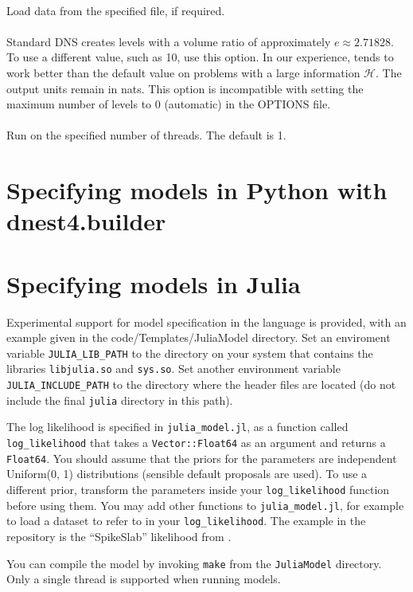 \documentclass[article]{jss}
\begin{document}
\\
Load data from the specified file, if required.\\

\\
Standard DNS creates levels with a volume ratio of approximately
$e\approx 2.71828$. To use a different value, such as 10, use this option.
In our experience,  tends to work better than the default
value on problems with a large information $\mathcal{H}$.
The output units remain in nats.
This option is incompatible with setting the maximum number of levels to 0
(automatic) in the OPTIONS file.
\\

\\
Run on the specified number of threads. The default is 1.

\section{Specifying models in Python with dnest4.builder}


\section{Specifying models in Julia}
Experimental support for model specification in the
 language is provided, with an example given in the
code/Templates/JuliaModel directory.
Set an enviroment variable {\tt JULIA\_LIB\_PATH} to the directory on your
system that contains the libraries {\tt libjulia.so} and
{\tt sys.so}. Set another environment variable {\tt JULIA\_INCLUDE\_PATH}
to the directory where the  header files are located
(do not include the final {\tt julia} directory in this path).

The log likelihood is specified in {\tt julia\_model.jl}, as a function
called {\tt log\_likelihood} that takes a {\tt Vector::Float64} as an argument
and returns a {\tt Float64}. You should assume that the priors for the
parameters are independent Uniform(0, 1) distributions (sensible default
proposals are used). To use a different prior, transform the parameters inside
your {\tt log\_likelihood} function before using them.
You may add other functions to {\tt julia\_model.jl}, for example to load
a dataset to refer to in your {\tt log\_likelihood}. The example in
the repository is the ``SpikeSlab'' likelihood from \citet{dnest}.

You can compile the model by invoking {\tt make}
from the {\tt JuliaModel} directory.
Only a single thread is supported when running 
models.
\end{document}
